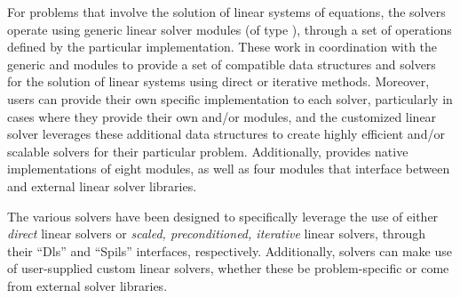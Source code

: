 %
For problems that involve the solution of linear systems of equations,
the {\sundials} solvers operate using generic linear solver modules
(of type ), through a set of operations defined by
the particular {\sunlinsol} implementation.  These work in
coordination with the {\sundials} generic {\nvector} and {\sunmatrix}
modules to provide a set of compatible data structures and solvers for
the solution of linear systems using direct or iterative methods.
Moreover, users can provide their own specific {\sunlinsol}
implementation to each {\sundials} solver, particularly in cases where
they provide their own {\nvector} and/or {\sunmatrix} modules, and the
customized linear solver leverages these additional data structures
to create highly efficient and/or scalable solvers for their
particular problem.  Additionally, {\sundials} provides native
implementations of eight {\sunlinsol} modules, as well as four
{\sunlinsol} modules that interface between {\sundials} and external
linear solver libraries.

The various {\sundials} solvers have been designed to specifically
leverage the use of either \emph{direct} linear solvers
or \emph{scaled, preconditioned, iterative} linear solvers, through
their ``Dls'' and ``Spils'' interfaces, respectively.  Additionally,
{\sundials} solvers can make use of user-supplied custom linear
solvers, whether these be problem-specific or come from external
solver libraries.

